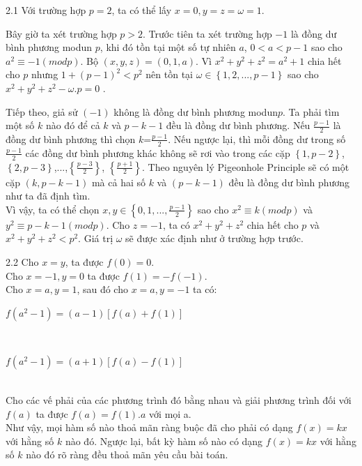 \begin{Answer}{2.1}
Với trường hợp $p=2$, ta có thể lấy $x=0, y=z=\omega=1$.

Bây giờ ta xét trường hợp $p>2$. Trước tiên ta xét trường hợp $-1$ là đồng dư bình phương modun  $p$,
khi đó tồn tại một số tự nhiên $a$, $0<a<p-1$ sao cho $a^{2}\equiv-1(modp)$.
Bộ $(x,y,z)=(0,1,a)$. Vì $x^{2}+y^{2}+z^{2}=a^{2}+1$  chia hết cho  $p$  nhưng $1+(p-1)^{2}<p^2$
nên tồn tại $\omega\in\left\{1,2,...,p-1\right\} $ sao cho  $x^{2}+y^{2}+z^{2}- \omega.p=0$ .

Tiếp theo, giả sử $(-1)$  không là đồng dư bình phương modun$p$. Ta phải tìm một số $k$ nào đó để cả $k$ và
 $p-k-1$ đều là đồng dư bình phương. Nếu $\frac{p-1}{2}$ là đồng dư bình phương thì chọn $k$=$\frac{p-1}{2}$.
Nếu ngược lại, thì mỗi đồng dư trong số $\frac{p-1}{2}$ các đồng dư bình phương khác không sẽ rơi vào trong
các cặp $\left\{1, p-2\right\}$, $\left\{2, p-3\right\}$,...,$\left\{\frac{p-3}{2}\right\}$, $\left\{\frac{p+1}{2}\right\}$.
Theo nguyên lý Pigeonhole Principle sẽ có một cặp $(k, p-k-1)$ mà cả hai số $k$ và $(p-k-1)$ đều là đồng dư bình
phương như ta đã định tìm.\\
Vì vậy, ta có thể chọn $x, y\in\left\{0, 1,..., \frac{p-1}{2}\right\}$ sao cho $x^{2}\equiv k (modp)$
và  $y^{2}\equiv p-k-1(modp)$. Cho $z=-1$, ta có $x^2+y^2+z^2$ chia hết cho $p$ và  $x^2+y^2+z^2 <p^2$.
Giá trị  $\omega$ sẽ được xác định như ở trường hợp trước.
\end{Answer}
\begin{Answer}{2.2}
Cho $x=y$, ta được $f(0)=0$.\\
Cho $x=-1, y=0$ ta được $f(1)=-f(-1)$.\\
Cho $x=a, y=1$, sau đó cho $x=a, y=-1$ ta có:\\
\centerline {$f(a^{2}-1)=(a-1)\left[f(a)+f(1)\right]$}\\
\centerline {$f(a^{2}-1)=(a+1)\left[f(a)-f(1)\right]$}\\
Cho các vế phải của các phương trình đó bằng nhau và giải phương trình đối với $f(a)$ ta được $f(a)=f(1).a$ với mọi a.\\
Như vậy, mọi hàm số nào thoả mãn ràng buộc đã cho phải có dạng $f(x)=kx$ với hằng số $k$ nào đó.
Ngược lại, bất kỳ hàm số nào có dạng $f(x)=kx$ với hằng số $k$ nào đó rõ ràng đều thoả mãn yêu cầu bài toán.
\end{Answer}
